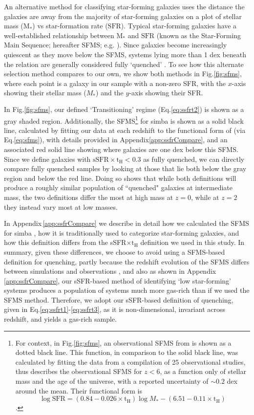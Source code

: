 \documentclass[twocolumn, linenumbers]{aastex631}
\newcommand{\sfr}{\text{SFR}}
\newcommand{\ssfr}{\text{sSFR}}
\newcommand{\tH}{\text{t}_\text{H}}
\newcommand{\eq}{Eq.\hspace{.2em}}
\renewcommand{\fig}{Fig.\hspace{.2em}}
\newcommand{\app}{Appendix\hspace{.2em}}
\newcommand{\simba}[0]{{\sc simba} }
\begin{document}
An alternative method for classifying star-forming galaxies uses the distance the galaxies are away from the majority of star-forming galaxies on a plot of stellar mass ($\text{M}_{*}$) vs star-formation rate ($\sfr$).  Typical star-forming galaxies have a well-established relationship between $\text{M}_{*}$ and $\sfr$ (known as the Star-Forming Main Sequence; hereafter SFMS; e.g. \citealt{noeske, whitaker12, sfms,Speagle14}).  Since galaxies become increasingly quiescent as they move below the SFMS, systems lying more than 1 dex beneath the relation are generally considered fully `quenched' \citep{Donnari19, Bluck20, whitakerReview}.  To see how this alternate selection method compares to our own, we show both methods in \fig \ref{fig:sfms}, where each point is a galaxy in our sample with a non-zero SFR, with the $x$-axis showing their stellar mass ($M_*$) and the $y$-axis showing their SFR.


In \fig \ref{fig:sfms}, our defined `Transitioning' regime (\eq \ref{eq:ssfrt2}) is shown as a gray shaded region.   Additionally, the SFMS\footnote{For context, in \fig \ref{fig:sfms}, an observational SFMS from \cite{Speagle14} is shown as a dotted black line.  This function, in comparison to the solid black line, was calculated by fitting the data from a compilation of 25 observational studies, thus describes the observational SFMS for $z< 6$, as a function only of stellar mass and the age of the universe, with a reported uncertainty of $\sim 0.2$ dex around the mean.  Their functional form is \[\log{\text{SFR}}=(0.84-0.026\times \tH)\log{M_*}-(6.51-0.11\times \tH)\].\label{foot:speagle}} for \simba is shown as a solid black line, calculated by fitting our data at each redshift to the functional form of \cite{whitaker12} (via \eq \ref{eq:sfms}), with details provided in \app \ref{app:ssfrCompare}, and an associated red solid line showing where galaxies are one dex below this SFMS.  Since we define galaxies with $\ssfr\times \tH<0.3$ as fully quenched, we can directly compare fully quenched samples by looking at those that lie both below the gray region and below the red line.  Doing so shows that while both definitions will produce a roughly similar population of ``quenched" galaxies at intermediate mass, the two definitions differ the most at high mass at $z=0$, while at $z=2$ they instead vary most at low masses.  

In \app\,\ref{app:ssfrCompare} we describe in detail how we calculated the SFMS for \simba\!\!, how it is traditionally used to categorize star-forming galaxies, and how this definition differs from the sSFR$\times\tH$ definition we used in this study.  In summary, given these differences, we choose to avoid using a SFMS-based definition for quenching, partly because the redshift evolution of the SFMS differs between simulations and observations \citep{bluck2023galaxy}, and also as shown in \app\,\ref{app:ssfrCompare}, our sSFR-based method of identifying `low star-forming' systems produces a population of systems much more gas-rich than if we used the SFMS method.  Therefore, we adopt our sSFR-based definition of quenching, given in \eq \ref{eq:ssfrt1}-\ref{eq:ssfrt3}, as it is non-dimensional, invariant across redshift, and yields a gas-rich sample.
\end{document}
